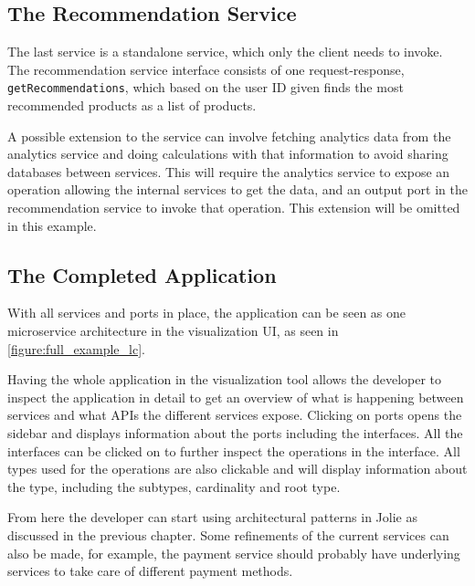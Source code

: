 \subsection{The Recommendation Service}
The last service is a standalone service, which only the client needs to invoke.
The recommendation service interface consists of one request-response, \texttt{getRecommendations},
which based on the user ID given finds the most recommended products as a list of products.

A possible extension to the service can involve fetching analytics data from the analytics service and doing calculations with that information to avoid sharing databases between services. This will require the analytics service to expose an operation allowing the internal services to get the data, and an output port in the recommendation service to invoke that operation.
This extension will be omitted in this example.

\subsection{The Completed Application}
With all services and ports in place, the application can be seen as one microservice architecture in the visualization UI, as seen in \cref{figure:full_example_lc}.

Having the whole application in the visualization tool allows the developer to inspect the application in detail to get an overview of what is happening between services and what APIs the different services expose.
Clicking on ports opens the sidebar and displays information about the ports including the interfaces. All the interfaces can be clicked on to further inspect the operations in the interface. All types used for the operations are also clickable and will display information about the type,
including the subtypes, cardinality and root type.

From here the developer can start using architectural patterns in Jolie as discussed in the previous chapter. Some refinements of the current services can also be made, for example, the payment service should probably have underlying services to take care of different payment methods.

